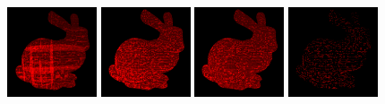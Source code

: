 \begin{figure}[!htb]
  \centering
  \includegraphics[width=100px]{images/graphics/overdraw-bunny1-nocull.png}
  \includegraphics[width=100px]{images/graphics/overdraw-bunny1-pooc.png}
  \includegraphics[width=100px]{images/graphics/overdraw-bunny1-pmoc.png}
  \includegraphics[width=100px]{images/graphics/overdraw-bunny1-diff.png}


\end{figure}
